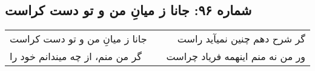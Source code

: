 \begin{center}
\section*{شماره ۹۶: جانا ز میانِ من و تو دست کراست}
\label{sec:096}
\begin{longtable}{l p{0.5cm} r}
جانا ز میانِ من و تو دست کراست
&&
گر شرح دهم چنین نمیآید راست
\\
گر من منم، از چه میندانم خود را
&&
ور من نه منم اینهمه فریاد چراست
\\
\end{longtable}
\end{center}
